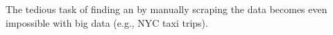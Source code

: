 The tedious task of finding an {\explanation} by manually scraping the data becomes even impossible with big data (e.g., NYC taxi trips).













